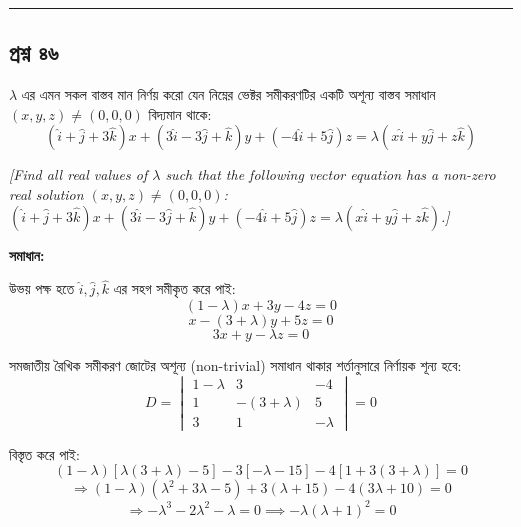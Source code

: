 \documentclass[11pt,a4paper]{article}
\begin{document}
\vspace{0.5cm}
\hrule
\vspace{0.5cm}

\subsection*{প্রশ্ন ৪৬}

$\lambda$ এর এমন সকল বাস্তব মান নির্ণয় করো যেন নিম্নের ভেক্টর সমীকরণটির একটি অশূন্য বাস্তব সমাধান $(x, y, z) \neq (0, 0, 0)$ বিদ্যমান থাকে:
$$(\hat{i}+\hat{j}+3\hat{k})x + (3\hat{i}-3\hat{j}+\hat{k})y + (-4\hat{i}+5\hat{j})z = \lambda(x\hat{i}+y\hat{j}+z\hat{k})$$

\smallskip
\textit{[Find all real values of $\lambda$ such that the following vector equation has a non-zero real solution $(x, y, z) \neq (0, 0, 0)$: $(\hat{i}+\hat{j}+3\hat{k})x + (3\hat{i}-3\hat{j}+\hat{k})y + (-4\hat{i}+5\hat{j})z = \lambda(x\hat{i}+y\hat{j}+z\hat{k})$.]}

\vspace{0.3cm}
\begin{center}
\end{center}

\textbf{সমাধান:}

উভয় পক্ষ হতে $\hat{i}, \hat{j}, \hat{k}$ এর সহগ সমীকৃত করে পাই:
$$(1-\lambda)x + 3y - 4z = 0$$
$$x - (3+\lambda)y + 5z = 0$$
$$3x + y - \lambda z = 0$$

সমজাতীয় রৈখিক সমীকরণ জোটের অশূন্য (non-trivial) সমাধান থাকার শর্তানুসারে নির্ণায়ক শূন্য হবে:
$$D = \begin{vmatrix} 1-\lambda & 3 & -4 \\ 1 & -(3+\lambda) & 5 \\ 3 & 1 & -\lambda \end{vmatrix} = 0$$

বিস্তৃত করে পাই:
$$(1-\lambda) [\lambda(3+\lambda) - 5] - 3 [-\lambda - 15] - 4 [1 + 3(3+\lambda)] = 0$$
$$\Rightarrow (1-\lambda) (\lambda^2 + 3\lambda - 5) + 3(\lambda + 15) - 4(3\lambda + 10) = 0$$
$$\Rightarrow -\lambda^3 - 2\lambda^2 - \lambda = 0 \implies -\lambda(\lambda + 1)^2 = 0$$
\end{document}
